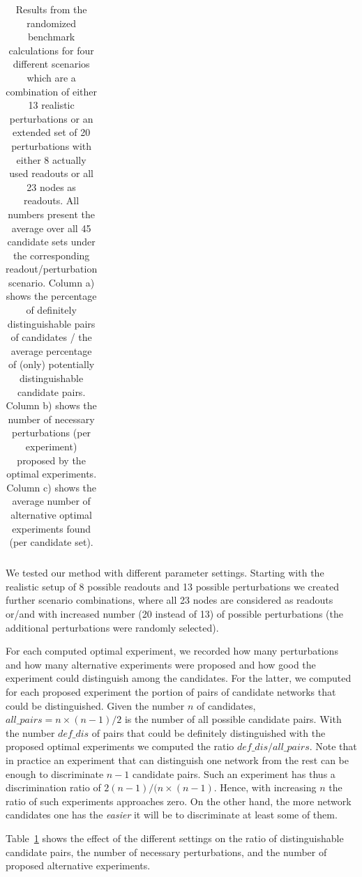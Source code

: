 \begin{table}[!t]
\begin{center}
\begin{tabular}{c}
\end{tabular}
\end{center}
\caption{
Results from the randomized benchmark calculations for four different scenarios which are a combination of either 13 realistic perturbations or an extended set of 20 perturbations with either 8 actually used readouts or all 23 nodes as readouts.
All numbers present the average over all 45 candidate sets under the corresponding readout/perturbation scenario.
Column a) shows the percentage of definitely distinguishable pairs of candidates /
the average percentage of (only) potentially distinguishable candidate pairs.
Column b) shows the  number of necessary perturbations (per experiment)
proposed by the optimal experiments.
Column c) shows the average number of alternative optimal experiments found
(per candidate set).}
\label{tab:empirical_study}
\end{table}

We tested our method with different parameter settings.
Starting with the realistic setup of 8 possible readouts and 13 possible perturbations
we created further scenario combinations,
where all 23 nodes are considered as readouts or/and with increased number (20 instead of 13)
of possible perturbations (the additional perturbations were randomly selected).

For each computed optimal experiment, we recorded how many perturbations
and how many alternative experiments were proposed
and how good the experiment could distinguish among the candidates.
For the latter, we computed for each proposed experiment the portion of pairs of candidate networks
that could be distinguished.
Given the number $n$ of candidates, $all\_pairs = n \times (n-1)/2$ is the number of all possible candidate pairs.
With the number $def\_dis$ of pairs that could be definitely distinguished
with the proposed optimal experiments we computed the ratio $def\_dis / all\_pairs$.
Note that in practice an experiment that can distinguish one network from the rest
can be enough to discriminate $n-1$ candidate pairs.
Such an experiment has thus a discrimination ratio of $2(n-1)/(n \times (n-1)$.
Hence, with increasing $n$ the ratio of such experiments approaches zero.
On the other hand, the more network candidates one has the \emph{easier} it will
be to discriminate at least some of them.

Table~\ref{tab:empirical_study} shows the effect of the different settings
on the ratio of distinguishable candidate pairs, the number of necessary perturbations,
and the number of proposed alternative experiments.


